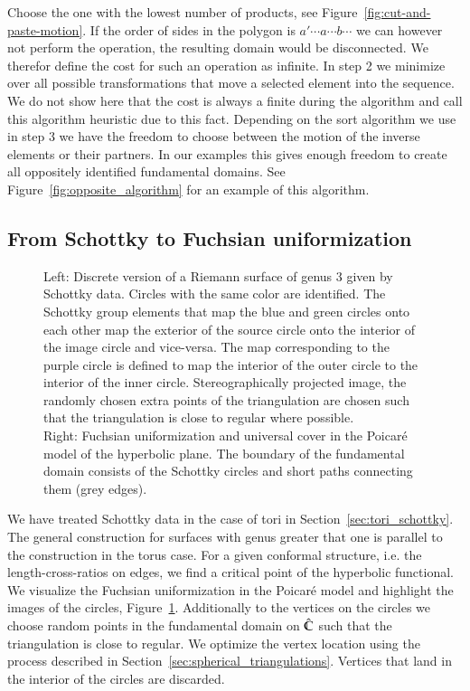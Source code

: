 \documentclass[Thesis]{subfiles}
\begin{document}
Choose the one with the lowest number of products, see Figure~\ref{fig:cut-and-paste-motion}. If the order of sides in the polygon is $a' \cdots a \cdots b \cdots$ we can however not perform the operation, the resulting domain would be disconnected. We therefor define the cost for such an operation as infinite. In step 2 we minimize over all possible transformations that move a selected element into the sequence. We do not show here that the cost is always a finite during the algorithm and call this algorithm heuristic due to this fact. Depending on the sort algorithm we use in step 3 we have the freedom to choose between the motion of the inverse elements or their partners. In our examples this gives enough freedom to create all oppositely identified fundamental domains. See Figure~\ref{fig:opposite_algorithm} for an example of this algorithm.


\subsection{From Schottky to Fuchsian uniformization}
\label{sec:schottky}

\begin{figure}
\centering
{}
\caption{
Left: Discrete version of a Riemann surface of genus $3$ given by Schottky data.
Circles with the same color are identified.
The Schottky group elements that map the blue and green circles onto each other map the exterior of the source circle onto the interior of the image circle and vice-versa.
The map corresponding to the purple circle is defined to map the interior of the outer circle to the interior of the inner circle. Stereographically projected image, the randomly chosen extra points of the triangulation are chosen such that the triangulation is close to regular where possible.
\\
Right: Fuchsian uniformization and universal cover in the Poicar\'e model of the hyperbolic plane. The boundary of the fundamental domain consists of  the Schottky circles and short paths connecting them (grey edges).
}
\label{fig:schottky_g3}
\end{figure}

We have treated Schottky data in the case of tori in Section~\ref{sec:tori_schottky}.
The general construction for surfaces with genus greater that one is parallel to the construction in the torus case.
For a given conformal structure, i.e. the length-cross-ratios on edges, we find a critical point of the hyperbolic functional.
We visualize the Fuchsian uniformization in the Poicar\'{e} model and highlight the images of the circles, Figure~\ref{fig:schottky_g3}.
Additionally to the vertices on the circles we choose random points in the fundamental domain on $\hat{\mathbb C}$ such that the triangulation is close to regular.
We optimize the vertex location using the process described in Section~\ref{sec:spherical_triangulations}.
Vertices that land in the interior of the circles are discarded.
\end{document}
